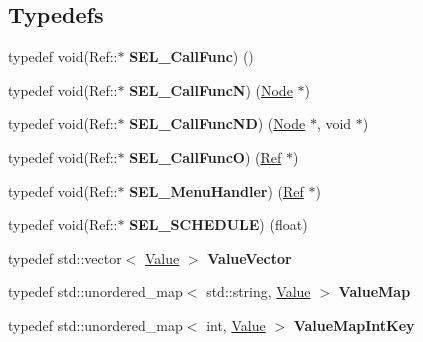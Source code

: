 \subsection*{Typedefs}
\begin{DoxyCompactItemize}
\item 
\mbox{\label{group__base_ga19c9d21cc6cacf9e102c7f405310968f}} 
typedef void(Ref\+::$\ast$ {\bfseries S\+E\+L\+\_\+\+Call\+Func}) ()
\item 
\mbox{\label{group__base_ga2421ba5f5eda401b167fffc76aba09c5}} 
typedef void(Ref\+::$\ast$ {\bfseries S\+E\+L\+\_\+\+Call\+FuncN}) (\hyperlink{classNode}{Node} $\ast$)
\item 
\mbox{\label{group__base_gade4d3700760c07b48e683e15ed122791}} 
typedef void(Ref\+::$\ast$ {\bfseries S\+E\+L\+\_\+\+Call\+Func\+ND}) (\hyperlink{classNode}{Node} $\ast$, void $\ast$)
\item 
\mbox{\label{group__base_gaef899e90936c229c2b588d816146898a}} 
typedef void(Ref\+::$\ast$ {\bfseries S\+E\+L\+\_\+\+Call\+FuncO}) (\hyperlink{classRef}{Ref} $\ast$)
\item 
\mbox{\label{group__base_gaa8b7b2585a8284d5b04a91137d227155}} 
typedef void(Ref\+::$\ast$ {\bfseries S\+E\+L\+\_\+\+Menu\+Handler}) (\hyperlink{classRef}{Ref} $\ast$)
\item 
\mbox{\label{group__base_gaf362983c7356c901e3efefc9aff49f55}} 
typedef void(Ref\+::$\ast$ {\bfseries S\+E\+L\+\_\+\+S\+C\+H\+E\+D\+U\+LE}) (float)
\item 
\mbox{\label{group__base_ga9ef3555e979a203b9619881b61866ca0}} 
typedef std\+::vector$<$ \hyperlink{classValue}{Value} $>$ {\bfseries Value\+Vector}
\item 
\mbox{\label{group__base_gae44b8cec5fcb05722ab75a7ca2f03fee}} 
typedef std\+::unordered\+\_\+map$<$ std\+::string, \hyperlink{classValue}{Value} $>$ {\bfseries Value\+Map}
\item 
\mbox{\label{group__base_ga733d2ae0a5704948dcfad9c985507cff}} 
typedef std\+::unordered\+\_\+map$<$ int, \hyperlink{classValue}{Value} $>$ {\bfseries Value\+Map\+Int\+Key}

\end{DoxyCompactItemize}
